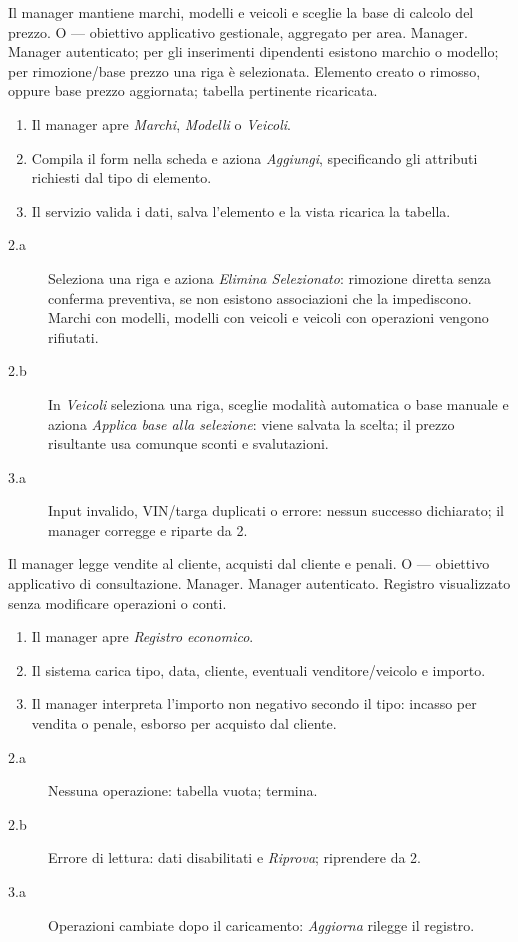 \clearpage
{}
{Il manager mantiene marchi, modelli e veicoli e sceglie la base di calcolo del prezzo.}
{O --- obiettivo applicativo gestionale, aggregato per area.}
{Manager.}
{Manager autenticato; per gli inserimenti dipendenti esistono marchio o modello;
per rimozione/base prezzo una riga \`e selezionata.}
{Elemento creato o rimosso, oppure base prezzo aggiornata; tabella pertinente ricaricata.}
\principale
\begin{enumerate}
\item Il manager apre \emph{Marchi}, \emph{Modelli} o \emph{Veicoli}.
\item Compila il form nella scheda e aziona \emph{Aggiungi}, specificando
  gli attributi richiesti dal tipo di elemento.
\item Il servizio valida i dati, salva l'elemento e la vista ricarica la tabella.
\end{enumerate}
\alternative
\begin{description}
\item[2.a] Seleziona una riga e aziona \emph{Elimina Selezionato}:
  rimozione diretta senza conferma preventiva, se non esistono associazioni che la impediscono.
  Marchi con modelli, modelli con veicoli e veicoli con operazioni vengono rifiutati.
\item[2.b] In \emph{Veicoli} seleziona una riga, sceglie modalit\`a automatica
  o base manuale e aziona \emph{Applica base alla selezione}: viene salvata
  la scelta; il prezzo risultante usa comunque sconti e svalutazioni.
\item[3.a] Input invalido, VIN/targa duplicati o errore: nessun successo dichiarato;
  il manager corregge e riparte da 2.
\end{description}

\clearpage
{}
{Il manager legge vendite al cliente, acquisti dal cliente e penali.}
{O --- obiettivo applicativo di consultazione.}
{Manager.}
{Manager autenticato.}
{Registro visualizzato senza modificare operazioni o conti.}
\principale
\begin{enumerate}
\item Il manager apre \emph{Registro economico}.
\item Il sistema carica tipo, data, cliente, eventuali venditore/veicolo e importo.
\item Il manager interpreta l'importo non negativo secondo il tipo:
  incasso per vendita o penale, esborso per acquisto dal cliente.
\end{enumerate}
\alternative
\begin{description}
\item[2.a] Nessuna operazione: tabella vuota; termina.
\item[2.b] Errore di lettura: dati disabilitati e \emph{Riprova}; riprendere da 2.
\item[3.a] Operazioni cambiate dopo il caricamento: \emph{Aggiorna} rilegge il registro.
\end{description}

